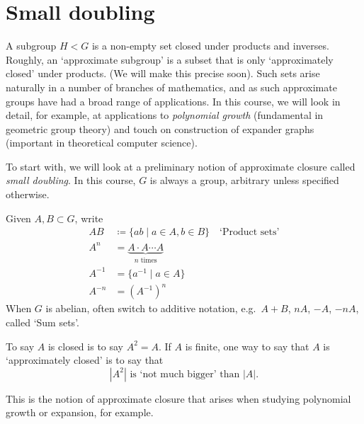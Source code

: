\documentclass{article}
\numberwithin{equation}{section}
\begin{document}
\maketitle

\tableofcontents

\clearpage
\section{Small doubling}
\newlec
A subgroup $H < G$ is a non-empty set closed under products and inverses.
Roughly, an `approximate subgroup' is a subset that is only `approximately closed' under products.
(We will make this precise soon).
Such sets arise naturally in a number of branches of mathematics, and as such approximate groups have had a broad range of applications.
In this course, we will look in detail, for example, at applications to \emph{polynomial growth} (fundamental in geometric group theory) and touch on construction of expander graphs (important in theoretical computer science).

To start with, we will look at a preliminary notion of approximate closure called \emph{small doubling}.
In this course, $G$ is always a group, arbitrary unless specified otherwise.
\begin{notation}
Given $A,B \subset G$, write
\begin{align*}
  AB &\coloneqq \{ab \mid a \in A, b \in B\} \quad \text{`Product sets'} \\
  A^n &= \underbrace{A \cdot A \dotsm A}_{n\text{ times}} \\
  A^{-1} &= \{a^{-1} \mid a \in A\} \\
  A^{-n} &= (A^{-1})^n
\end{align*}
When $G$ is abelian, often switch to additive notation, e.g.\ $A + B$, $nA$, $-A$, $-nA$, called `Sum sets'.
\end{notation}

To say $A$ is closed is to say $A^2 = A$. If $A$ is finite, one way to say that $A$ is `approximately closed' is to say that
\begin{equation*}
  |A^2| \text{ is `not much bigger' than } |A|.
\end{equation*}

This is the notion of approximate closure that arises when studying polynomial growth or expansion, for example.
\end{document}
